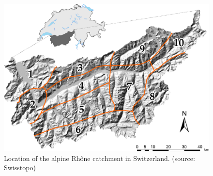 \documentclass[5p]{elsarticle}
\begin{document}
\begin{figure}[htb]
	\centerline{\includegraphics[width=\linewidth]{figures/figure_map.pdf}}
	\caption{Location of the alpine Rh\^{o}ne catchment in Switzerland. (source: Swisstopo)}
	\label{fig:map}
\end{figure}
\end{document}
